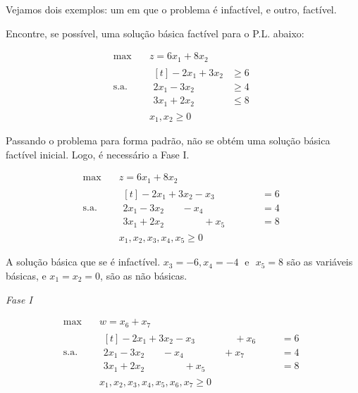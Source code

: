Vejamos dois exemplos: um em que o problema é infactível, e outro, factível.

\begin{exemplo}
  Encontre, se possível, uma solução básica factível para o P.L. abaixo:

  \begin{align*}
    \max        \quad & z = 6 x_1 + 8 x_2 \\
    \text{s.a.} \quad & 
                        \begin{aligned}[t]
                          -2 x_1 + 3 x_2 &\geq 6 \\
                           2 x_1 - 3 x_2 &\geq 4 \\
                           3 x_1 + 2 x_2 &\leq 8
                        \end{aligned}\\
                      & x_1, x_2 \geq 0
  \end{align*}
\end{exemplo}

Passando o problema para forma padrão, não se obtém uma solução básica factível
inicial.
Logo, é necessário a Fase I.

\begin{align*}
  \max        \quad & z = 6 x_1 + 8 x_2 \\
  \text{s.a.} \quad &
                      \begin{aligned}[t]
                        -2 x_1 + 3 x_2 - x_3 \phantom{- x_4 + x_5}           &= 6 \\
                         2 x_1 - 3 x_2 \phantom{- x_3} - x_4 \phantom{+ x_5} &= 4 \\
                         3 x_1 + 2 x_2 \phantom{- x_3 - x_4} + x_5           &= 8
                      \end{aligned}\\
                    & x_1, x_2, x_3, x_4, x_5 \geq 0
\end{align*}

A solução básica que se é infactível.
$ x_3 = -6, x_4 = -4 \;\text{ e } $ $ x_5 = 8 $ são as variáveis básicas, e 
$ x_1 = x_2 = 0 $, são as não básicas.

\textit{Fase I}

\begin{align*}
  \max        \quad & w = x_6 + x_7 \\
  \text{s.a.} \quad &
                      \begin{aligned}[t]
                        -2 x_1 + 3 x_2 - x_3 \phantom{- x_4 + x_5} + x_6 \phantom{+ x_7} &= 6 \\
                         2 x_1 - 3 x_2 \phantom{- x_3} - x_4 \phantom{+ x_5 + x_6} + x_7 &= 4 \\
                         3 x_1 + 2 x_2 \phantom{- x_3 - x_4} + x_5 \phantom{+ x_6 + x_7} &= 8
                      \end{aligned}\\
                    & x_1, x_2, x_3, x_4, x_5, x_6, x_7 \geq 0
\end{align*}

